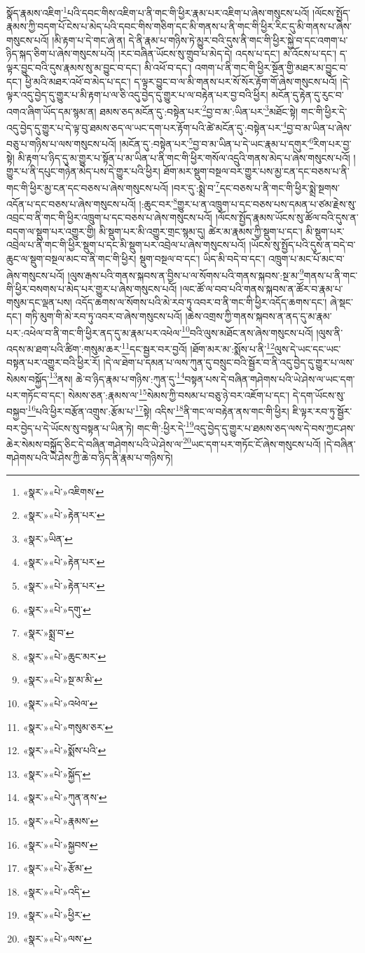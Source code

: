 སྣོད་རྣམས་འཇིག་\footnote{«སྣར་»«པེ་»འཇིགས་}པའི་དབང་གིས་འཇིག་པ་ནི་གང་གི་ཕྱིར་རྣམ་པར་འཇིག་པ་ཞེས་གསུངས་པའོ། །ལོངས་སྤྱོད་རྣམས་ཀྱི་བདག་པོ་ངེས་པ་མེད་པའི་དབང་གིས་གཅིག་དང་མི་གནས་པ་ནི་གང་གི་ཕྱིར་རིང་དུ་མི་གནས་པ་ཞེས་གསུངས་པའོ། །མི་རྟག་པ་དེ་གང་ཞེ་ན། དེ་ནི་རྣམ་པ་གཉིས་ཏེ་མྱུར་བའི་དུས་ནི་གང་གི་ཕྱིར་སྐྱེ་བ་དང་འགག་པ་ཉིད་སྐད་ཅིག་པ་ཞེས་གསུངས་པའོ། །རང་བཞིན་ཡོངས་སུ་གྲུབ་པ་མེད་དེ། འདས་པ་དང་། མ་འོངས་པ་དང་། ད་ལྟར་བྱུང་བའི་དུས་རྣམས་སུ་མ་བྱུང་བ་དང་། མི་འཕོ་བ་དང་། འགག་པ་ནི་གང་གི་ཕྱིར་སྔོན་གྱི་མཐར་མ་བྱུང་བ་དང་། ཕྱི་མའི་མཐར་འཕོ་བ་མེད་པ་དང་། ད་ལྟར་བྱུང་བ་ལ་མི་གནས་པར་སོ་སོར་རྟོག་གོ་ཞེས་གསུངས་པའོ། །དེ་ལྟར་འདུ་བྱེད་དུ་གྱུར་པ་མི་རྟག་པ་ལ་ཅི་འདུ་བྱེད་དུ་གྱུར་པ་ལ་བརྟེན་པར་བྱ་བའི་ཕྱིར། མངོན་དུ་རྟེན་དུ་རུང་བ་འགའ་ཞིག་ཡོད་དམ་སྙམ་ན། ཐམས་ཅད་མངོན་དུ་:བསྟེན་པར་\footnote{«སྣར་»«པེ་»རྟེན་པར་}བྱ་བ་མ་:ཡིན་པར་\footnote{«སྣར་»ཡིན་}མཐོང་སྟེ། གང་གི་ཕྱིར་དེ་འདུ་བྱེད་དུ་གྱུར་པ་དེ་ལྟ་བུ་ཐམས་ཅད་ལ་ཡང་དག་པར་རྟོག་པའི་ཚེ་མངོན་དུ་:བསྟེན་པར་\footnote{«སྣར་»«པེ་»རྟེན་པར་}བྱ་བ་མ་ཡིན་པ་ཞེས་བཅུ་པ་གཉིས་པ་ལས་གསུངས་པའོ། །མངོན་དུ་:བསྟེན་པར་\footnote{«སྣར་»«པེ་»རྟེན་པར་}བྱ་བ་མ་ཡིན་པ་དེ་ཡང་རྣམ་པ་དགུར་\footnote{«སྣར་»«པེ་»དགུ་}རིག་པར་བྱ་སྟེ། མི་རྟག་པ་ཉིད་དུ་མ་གྱུར་པ་སྟོན་པ་མ་ཡིན་པ་ནི་གང་གི་ཕྱིར་གསོལ་འདྲུའི་གནས་མེད་པ་ཞེས་གསུངས་པའོ། །གྱུར་པ་ནི་དཔུང་གཉེན་མེད་པས་དེ་གྱུར་པའི་ཕྱིར། ཐོག་མར་སྡུག་བསྔལ་བར་གྱུར་པས་མྱ་ངན་དང་བཅས་པ་ནི་གང་གི་ཕྱིར་མྱ་ངན་དང་བཅས་པ་ཞེས་གསུངས་པའོ། །བར་དུ་:སྨྲེ་བ་\footnote{«སྣར་»སྨྲ་བ་}དང་བཅས་པ་ནི་གང་གི་ཕྱིར་སྨྲེ་སྔགས་འདོན་པ་དང་བཅས་པ་ཞེས་གསུངས་པའོ། །:ཆུང་བར་\footnote{«སྣར་»«པེ་»ཆུང་མར་}གྱུར་པ་ན་འཁྲུག་པ་དང་བཅས་པས་དམན་པ་ཙམ་རྗེས་སུ་འབྲང་བ་ནི་གང་གི་ཕྱིར་འཁྲུག་པ་དང་བཅས་པ་ཞེས་གསུངས་པའོ། །ལོངས་སྤྱོད་རྣམས་ཡོངས་སུ་ཚོལ་བའི་དུས་ན་བདག་ལ་སྡུག་པར་འགྱུར་གྱི། མི་སྡུག་པར་མི་འགྱུར་གྲང་སྙམ་དུ། ཚེར་མ་རྣམས་ཀྱི་སྡུག་པ་དང་། མི་སྡུག་པར་འབྲེལ་པ་ནི་གང་གི་ཕྱིར་སྡུག་པ་དང་མི་སྡུག་པར་འབྲེལ་པ་ཞེས་གསུངས་པའོ། །ཡོངས་སུ་སྤྱོད་པའི་དུས་ན་བདེ་བ་ཆུང་ལ་སྡུག་བསྔལ་མང་བ་ནི་གང་གི་ཕྱིར། སྡུག་བསྔལ་བ་དང་། ཡིད་མི་བདེ་བ་དང་། འཁྲུག་པ་མང་པོ་མང་བ་ཞེས་གསུངས་པའོ། །ལུས་རྒས་པའི་གནས་སྐབས་ན་བྱིས་པ་ལ་སོགས་པའི་གནས་སྐབས་:སྔ་མ་\footnote{«སྣར་»«པེ་»སྔ་མ་མི་}གནས་པ་ནི་གང་གི་ཕྱིར་བསགས་པ་མེད་པར་གྱུར་པ་ཞེས་གསུངས་པའོ། །ལང་ཚོ་ལ་བབ་པའི་གནས་སྐབས་ན་ཚོར་བ་རྣམ་པ་གསུམ་དང་ལྡན་པས། འདོད་ཆགས་ལ་སོགས་པའི་མེ་རབ་ཏུ་འབར་བ་ནི་གང་གི་ཕྱིར་འདོད་ཆགས་དང་། ཞེ་སྡང་དང་། གཏི་མུག་གི་མེ་རབ་ཏུ་འབར་བ་ཞེས་གསུངས་པའོ། །ཆེས་འགྲས་ཀྱི་གནས་སྐབས་ན་ནད་དུ་མ་རྣམ་པར་:འཕེལ་བ་ནི་གང་གི་ཕྱིར་ནད་དུ་མ་རྣམ་པར་འཕེལ་\footnote{«སྣར་»«པེ་»འཕེལ་}བའི་ལུས་མཐོང་ནས་ཞེས་གསུངས་པའོ། །ལུས་ནི་འདས་མ་ཐག་པའི་ཚིག་:གསུམ་ཆར་\footnote{«སྣར་»«པེ་»གསུམ་ཅར་}དང་སྦྱར་བར་བྱའོ། །ཐོག་མར་མ་:སྨོས་པ་ནི་\footnote{«སྣར་»«པེ་»སྨོས་པའི་}ལུས་དེ་ཡང་དང་ཡང་བསྟན་པར་འགྱུར་བའི་ཕྱིར་རོ། །དེ་ལ་ཐེག་པ་དམན་པ་ལས་ཀུན་དུ་བསྲུང་བའི་སྦྱོར་བ་ནི་འདུ་བྱེད་དུ་གྱུར་པ་ལས་སེམས་བསྐྱོད་\footnote{«སྣར་»«པེ་»སྐྱོད་}ནས། ཆེ་བ་ཉིད་རྣམ་པ་གཉིས་:ཀུན་དུ་\footnote{«སྣར་»«པེ་»ཀུན་ནས་}བསྟན་པས་དེ་བཞིན་གཤེགས་པའི་ཡེ་ཤེས་ལ་ཡང་དག་པར་གཏོང་བ་དང་། སེམས་ཅན་:རྣམས་ལ་\footnote{«སྣར་»«པེ་»རྣམས་}སེམས་ཀྱི་བསམ་པ་བཅུ་ཉེ་བར་འཇོག་པ་དང་། དེ་དག་ཡོངས་སུ་བསྐྱབ་\footnote{«སྣར་»«པེ་»སྐྱབས་}པའི་ཕྱིར་བརྩོན་འགྲུས་:རྩོམ་པ་\footnote{«སྣར་»«པེ་»རྩོམ་}སྟེ། འདིས་\footnote{«སྣར་»«པེ་»འདི་}ནི་གང་ལ་བརྟེན་ནས་གང་གི་ཕྱིར། ཇི་ལྟར་རབ་ཏུ་སྦྱོར་བར་བྱེད་པ་དེ་ཡོངས་སུ་བསྟན་པ་ཡིན་ཏེ། གང་གི་:ཕྱིར་དེ་\footnote{«སྣར་»«པེ་»ཕྱིར་}འདུ་བྱེད་དུ་གྱུར་པ་ཐམས་ཅད་ལས་དེ་བས་ཀྱང་ཤས་ཆེར་སེམས་བསྐྱོད་ཅིང་དེ་བཞིན་གཤེགས་པའི་ཡེ་ཤེས་ལ་\footnote{«སྣར་»«པེ་»ལས་}ཡང་དག་པར་གཏོང་ངོ་ཞེས་གསུངས་པའོ། །དེ་བཞིན་གཤེགས་པའི་ཡེ་ཤེས་ཀྱི་ཆེ་བ་ཉིད་ནི་རྣམ་པ་གཉིས་ཏེ། 